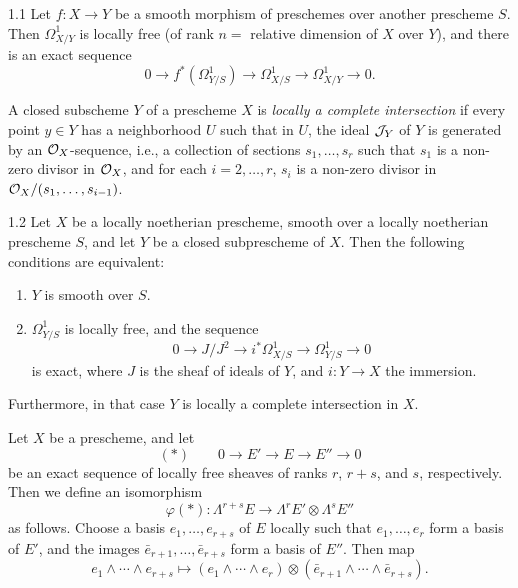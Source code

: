 \begin{bookproposition}{1.1}\label{prop:3.1.1}
\cite[--61, II,~4.3]{SGA} Let $f\colon X\to Y$ be a smooth morphism of preschemes over another prescheme $S$. Then $\Omega^1_{X/Y}$ is locally free (of rank $n=$ relative dimension of $X$ over $Y$), and there is an exact sequence
\[
0 \longrightarrow f^*(\Omega^1_{Y/S}) \longrightarrow \Omega^1_{X/S} \longrightarrow \Omega^1_{X/Y} \longrightarrow 0.
\]
\end{bookproposition}

\begin{definition*}
A closed subscheme $Y$ of a prescheme $X$ is \emph{locally a complete intersection} if every point $y\in Y$ has a neighborhood $U$ such that in $U$, the ideal $\mathcal{J}_Y$ of $Y$ is generated by an $\mathcal{O}_X$-sequence, i.e., a collection of sections $s_1,\dots,s_r$ such that $s_1$ is a non-zero divisor in $\mathcal{O}_X$, and for each $i=2,\dots,r$, $s_i$ is a non-zero divisor in $\mathcal{O}_X/(s_1,\dots,s_{i-1})$.
\end{definition*}

\begin{bookproposition}{1.2}\label{prop:3.1.2}
\cite[--61, II,~4.10]{SGA} Let $X$ be a locally noetherian prescheme, smooth over a locally noetherian prescheme $S$, and let $Y$ be a closed subprescheme of $X$. Then the following conditions are equivalent:
\begin{enumerate}
\item[(i)] $Y$ is smooth over $S$.
\item[(ii)] $\Omega^1_{Y/S}$ is locally free, and the sequence
\[
0 \longrightarrow J/J^2 \longrightarrow i^*\Omega^1_{X/S} \longrightarrow \Omega^1_{Y/S} \longrightarrow 0
\]
is exact, where $J$ is the sheaf of ideals of $Y$, and $i\colon Y\to X$ the immersion.
\end{enumerate}
Furthermore, in that case $Y$ is locally a complete intersection in $X$.
\end{bookproposition}

\begin{definition*}
Let $X$ be a prescheme, and let
\[
(*)\qquad 0 \longrightarrow E' \longrightarrow E \longrightarrow E'' \longrightarrow 0
\]
be an exact sequence of locally free sheaves of ranks $r$, $r+s$, and $s$, respectively. Then we define an isomorphism
\[
\varphi(*)\colon \Lambda^{r+s}E \longrightarrow \Lambda^r E' \otimes \Lambda^s E''
\]
as follows. Choose a basis $e_1,\dots,e_{r+s}$ of $E$ locally such that $e_1,\dots,e_r$ form a basis of $E'$, and the images $\bar{e}_{r+1},\dots,\bar{e}_{r+s}$ form a basis of $E''$. Then map
\[
e_1\wedge\cdots\wedge e_{r+s} \longmapsto (e_1\wedge\cdots\wedge e_r)\otimes(\bar{e}_{r+1}\wedge\cdots\wedge\bar{e}_{r+s}).
\]
\end{definition*}

